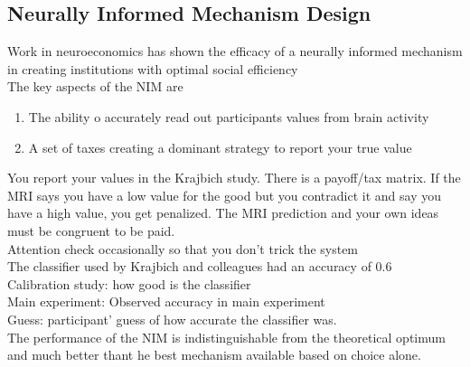 \subsection{Neurally Informed Mechanism Design}
Work in neuroeconomics has shown the efficacy of a neurally informed mechanism in creating institutions with optimal social efficiency
\\The key aspects of the NIM are
\begin{enumerate}
    \item The ability o accurately read out participants values from brain activity
 
\item A set of taxes creating a dominant strategy to report your true value
\end{enumerate}
You report your values in the Krajbich study. There is a payoff/tax matrix. If the MRI says you have a low value for the good but you contradict it and say you have a high value, you get penalized. The MRI prediction and your own ideas must be  congruent to be paid.
\\Attention check occasionally so that you don't trick the system
\\The classifier used by Krajbich and colleagues had an accuracy of 0.6
\\Calibration study: how good is the classifier
\\Main experiment: Observed accuracy in main experiment
\\Guess: participant' guess of how accurate the classifier was.
\\The performance of the NIM is indistinguishable from the theoretical optimum and much better thant he best mechanism available based on choice alone.
